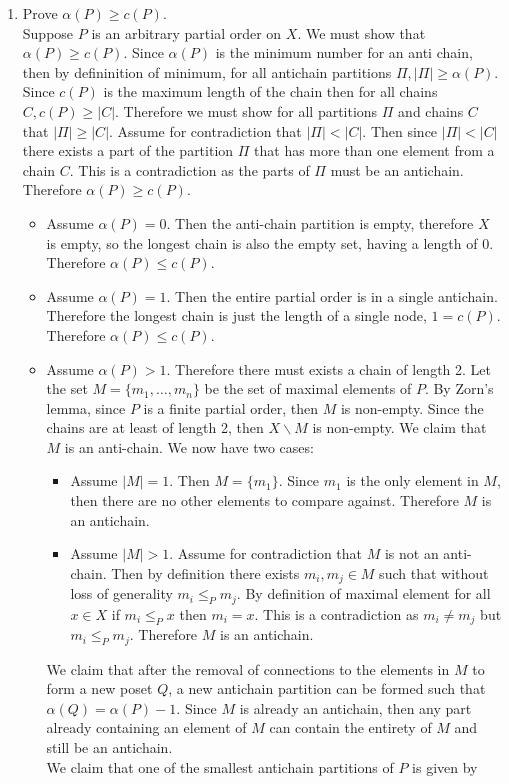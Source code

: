 \documentclass[12pt, letterpaper]{article}
\begin{document}
\begin{enumerate}
\item Prove $\alpha(P) \geq c(P)$.\\ %
Suppose $P$ is an arbitrary partial order on $X$.  We must show that $\alpha(P) \geq c(P)$.  
	Since $\alpha(P)$ is the minimum number for an anti chain, then by defininition of minimum, for all antichain partitions $\Pi, |\Pi| \geq \alpha(P).$  Since $c(P)$ is the maximum length of the chain then for all chains $C, c(P) \geq |C|.$  Therefore we must show for all partitions $\Pi$ and chains $C$ that $|\Pi| \geq |C|.$  Assume for contradiction that $|\Pi| <|C|.$  Then since $|\Pi| < |C|$ there exists a part of the partition $\Pi$ that has more than one element from a chain $C$.  This is a contradiction as the parts of $\Pi$ must be an antichain.  Therefore $\alpha(P) \geq c(P)$.

\iffalse
\begin{itemize}
		

	\item Assume $\alpha(P) = 0.$ Then the anti-chain partition is empty, therefore $X$ is empty, so the longest chain is also the empty set, having a length of 0.  Therefore $\alpha(P) \leq c(P).$
	\item Assume $\alpha(P) = 1.$  Then the entire partial order is in a single antichain.  Therefore the longest chain is just the length of a single node, $1=c(P).$  Therefore $\alpha(P) \leq c(P).$
	\item Assume $\alpha(P) > 1.$  Therefore there must exists a chain of length 2.  Let the set $M = \{m_1,\ldots,m_n\}$ be the set of maximal elements of $P$.  By Zorn's lemma, since $P$ is a finite partial order, then $M$ is non-empty.  Since the chains are at least of length 2, then $X\backslash M$ is non-empty.  We claim that $M$ is an anti-chain.  We now have two cases:\begin{itemize}
	\item Assume $|M| = 1$.  Then $M = \{m_1\}.$  Since $m_1$ is the only element in $M$, then there are no other elements to compare against.  Therefore $M$ is an antichain.
	\item Assume $|M| > 1$. Assume for contradiction that $M$ is not an anti-chain. Then by definition there exists $m_i, m_j \in M$ such that without loss of generality $m_i \leq_P m_j$.  By definition of maximal element for all $x \in X$ if $m_i \leq_P x$ then $m_i = x.$  This is a contradiction as $m_i \neq m_j$ but $m_i \leq_P m_j.$  Therefore $M$ is an antichain.
\end{itemize}
	We claim that after the removal of connections to the elements in $M$ to form a new poset $Q$, a new antichain partition can be formed such that $\alpha(Q) = \alpha(P) - 1.$  Since $M$ is already an antichain, then any part already containing an element of $M$ can contain the entirety of $M$ and still be an antichain.\\
	We claim that one of the smallest antichain partitions of $P$ is given by 


\end{itemize}
\end{enumerate}
\end{document}
